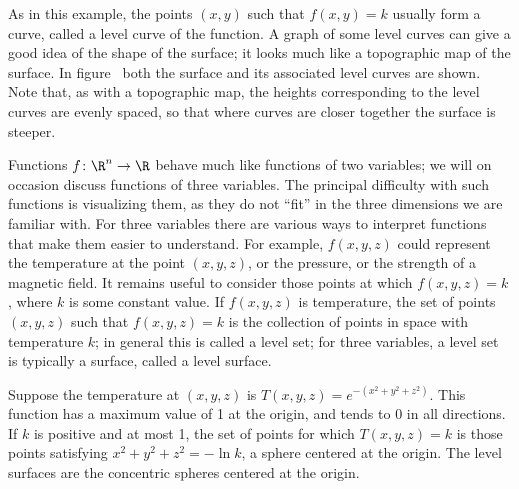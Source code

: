As in this example, the points $(x,y)$ such that $f(x,y)=k$ usually
form a curve, called a {\dfont level curve} of the
function. A graph of some level curves can give a good idea of the
shape of the surface; it looks much like a topographic map of the
surface. In figure~ both the surface and
its associated level curves are shown. Note that, as with a
topographic map, the heights corresponding to the level curves are
evenly spaced, so that where curves are closer together the surface is
steeper.

Functions $f\colon \R^n\to\R$ behave much like functions of two
variables; we will on occasion discuss functions of three variables.
The principal difficulty with such functions is visualizing them, as
they do not ``fit'' in the three dimensions we are familiar with. For
three variables there are various ways to interpret functions that
make them easier to understand. For example, $f(x,y,z)$ could
represent the temperature at the point $(x,y,z)$, or the pressure, or
the strength of a magnetic field.  It remains useful to consider those
points at which $f(x,y,z)=k$, where $k$ is some constant value. If
$f(x,y,z)$ is temperature, the set of points $(x,y,z)$ such that
$f(x,y,z)=k$ is the collection of points in space with temperature $k$;
in general this is called a {\dfont level set}; for
three variables, a level set is typically a surface, called a {\dfont
  level surface}.

\begin{example} Suppose the temperature at $(x,y,z)$ is 
$T(x,y,z)=e^{-(x^2+y^2+z^2)}$. This function has a maximum value of 1
at the origin, and tends to 0 in all directions. If $k$ is positive
and at most 1,
the set of points for which $T(x,y,z)=k$ is those points satisfying
$x^2+y^2+z^2=-\ln k$, a sphere centered at the origin. The level
surfaces are the concentric spheres centered at the origin.
\end{example}

